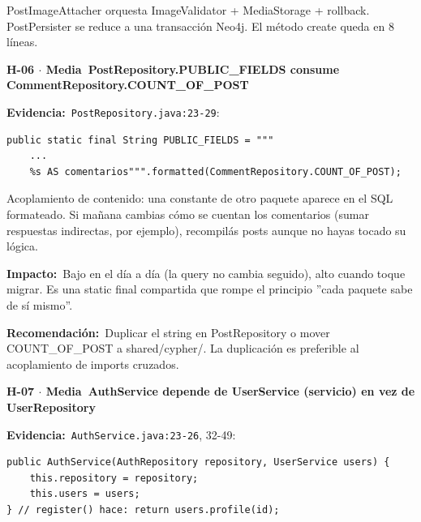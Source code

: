 \documentclass[10pt,a4paper]{article}
\newcommand{\code}[1]{\nolinkurl{#1}}
\newcommand{\badgeMedia}{\colorbox{yellow!35}{\textcolor{brown!90!black}{\textbf{\footnotesize Media}}}}
\begin{document}
PostImageAttacher orquesta ImageValidator + MediaStorage + rollback. PostPersister se reduce a una transacción Neo4j. El método create queda en 8 líneas.\par\vspace{0.4em}
\vspace{0.8em}\noindent\textbf{\large H-06 $\cdot$ \badgeMedia\  PostRepository.PUBLIC\_FIELDS consume CommentRepository.COUNT\_OF\_POST}\par\vspace{0.3em}
\noindent\textbf{Evidencia:}\ \code{PostRepository.java:23-29}:\par\vspace{0.4em}
\begin{tcolorbox}[colback=codebg,colframe=gray!40,arc=1mm]\small
\begin{verbatim}
public static final String PUBLIC_FIELDS = """
    ...
    %s AS comentarios""".formatted(CommentRepository.COUNT_OF_POST);
\end{verbatim}
\end{tcolorbox}\vspace{0.4em}
Acoplamiento de contenido: una constante de otro paquete aparece en el SQL formateado. Si mañana cambias cómo se cuentan los comentarios (sumar respuestas indirectas, por ejemplo), recompilás posts aunque no hayas tocado su lógica.\par\vspace{0.4em}
\noindent\textbf{Impacto:}\ Bajo en el día a día (la query no cambia seguido), alto cuando toque migrar. Es una static final compartida que rompe el principio ''cada paquete sabe de sí mismo''.\par\vspace{0.4em}
\noindent\textbf{Recomendación:}\ Duplicar el string en PostRepository o mover COUNT\_OF\_POST a shared/cypher/. La duplicación es preferible al acoplamiento de imports cruzados.\par\vspace{0.4em}
\vspace{0.8em}\noindent\textbf{\large H-07 $\cdot$ \badgeMedia\  AuthService depende de UserService (servicio) en vez de UserRepository}\par\vspace{0.3em}
\noindent\textbf{Evidencia:}\ \code{AuthService.java:23-26}, 32-49:\par\vspace{0.4em}
\begin{tcolorbox}[colback=codebg,colframe=gray!40,arc=1mm]\small
\begin{verbatim}
public AuthService(AuthRepository repository, UserService users) {
    this.repository = repository;
    this.users = users;
} // register() hace: return users.profile(id);
\end{verbatim}
\end{tcolorbox}\vspace{0.4em}
\end{document}
